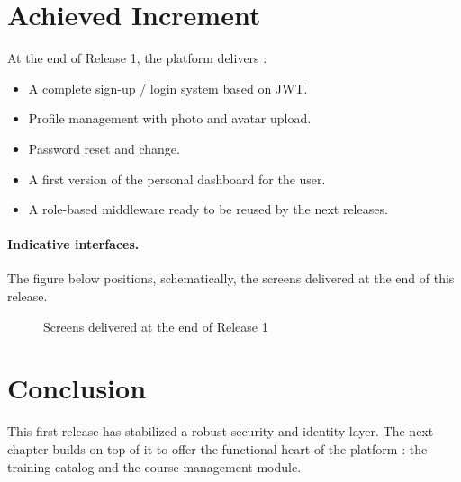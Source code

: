 \section{Achieved Increment}

At the end of Release 1, the platform delivers :
\begin{itemize}[leftmargin=2em,itemsep=0.2em]
  \item A complete sign-up / login system based on JWT.
  \item Profile management with photo and avatar upload.
  \item Password reset and change.
  \item A first version of the personal dashboard for the user.
  \item A role-based middleware ready to be reused by the next releases.
\end{itemize}

\paragraph{Indicative interfaces.}
The figure below positions, schematically, the screens delivered at the end of this release.

\begin{figure}[H]
\centering
{}
\caption{Screens delivered at the end of Release 1}
\label{fig:r1-screens}
\end{figure}

\section{Conclusion}

This first release has stabilized a robust security and identity layer. The next chapter builds on top of it to offer the functional heart of the platform : the training catalog and the course-management module.
